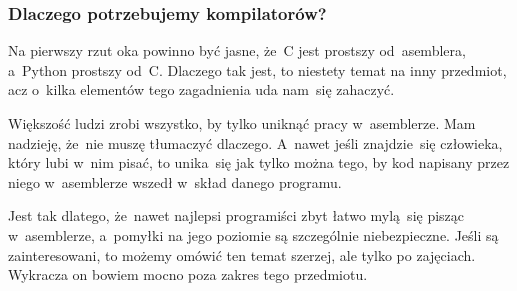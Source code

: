 \documentclass[10pt,t]{beamer}
\begin{document}
\begin{frame}
  \frametitle{Dlaczego potrzebujemy kompilatorów?}


  Na pierwszy rzut oka powinno być jasne, że~C jest prostszy od~asemblera,
  a~Python prostszy od~C. Dlaczego tak jest, to niestety temat na inny
  przedmiot, acz o~kilka elementów tego zagadnienia uda nam~się zahaczyć.

  Większość ludzi zrobi wszystko, by tylko uniknąć pracy w~asemblerze.
  Mam nadzieję, że~nie muszę tłumaczyć dlaczego.  A~nawet jeśli
  znajdzie~się człowieka, który lubi w~nim pisać, to unika~się jak tylko
  można tego, by kod napisany przez niego w~asemblerze wszedł w~skład
  danego programu.

  Jest tak dlatego, że~nawet najlepsi programiści zbyt łatwo mylą~się
  pisząc w~asemblerze, a~pomyłki na jego poziomie są szczególnie
  niebezpieczne. Jeśli są zainteresowani, to możemy omówić ten temat
  szerzej, ale tylko po zajęciach. Wykracza on bowiem mocno poza zakres tego
  przedmiotu.

\end{frame}
\end{document}
